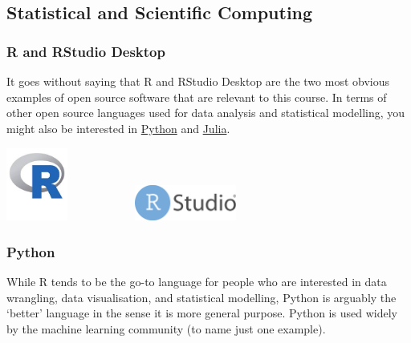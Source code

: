 \documentclass[
]{book}
\begin{document}
~~

~~

\hypertarget{statistical-and-scientific-computing}{%
\subsection{Statistical and Scientific Computing}\label{statistical-and-scientific-computing}}

\hypertarget{r-and-rstudio-desktop}{%
\subsubsection*{R and RStudio Desktop}\label{r-and-rstudio-desktop}}

It goes without saying that R and RStudio Desktop are the two most obvious examples of open source software that are relevant to this course. In terms of other open source languages used for data analysis and statistical modelling, you might also be interested in \href{https://www.python.org}{Python} and \href{https://julialang.org/}{Julia}.

\href{https://www.r-project.org}{\includegraphics[width=0.15\textwidth,height=\textheight]{images/r_logo.jpeg}}~~~~~~~~~~~~\href{https://posit.co/products/open-source/rstudio}{\includegraphics[width=0.25\textwidth,height=\textheight]{images/RStudio-Logo-Flat.png}}

\hypertarget{python}{%
\subsubsection*{Python}\label{python}}

While R tends to be the go-to language for people who are interested in data wrangling, data visualisation, and statistical modelling, Python is arguably the `better' language in the sense it is more general purpose. Python is used widely by the machine learning community (to name just one example).
\end{document}
